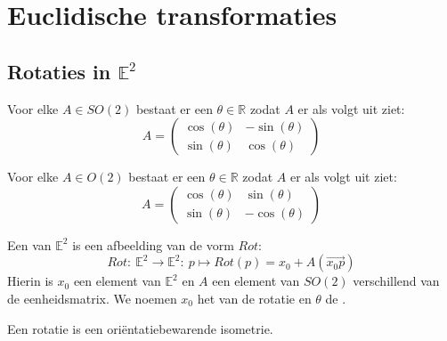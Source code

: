 \documentclass[main.tex]{subfiles}
\begin{document}
\chapter{Euclidische transformaties}
\label{cha:euclidische-transformaties}

\section{Rotaties in $\mathbb{E}^{2}$}
\label{sec:roties-in-e2}

\begin{lem}
  Voor elke $A\in SO(2)$ bestaat er een $\theta\in \mathbb{R}$ zodat $A$ er als volgt uit ziet:
  \[
  A =
  \begin{pmatrix}
    \cos(\theta) & -\sin(\theta)\\
    \sin(\theta) & \cos(\theta)
  \end{pmatrix}
  \]
\end{lem}

\begin{st}
  Voor elke $A\in O(2)$ bestaat er een $\theta\in \mathbb{R}$ zodat $A$ er als volgt uit ziet:
  \[
  A =
  \begin{pmatrix}
    \cos(\theta) & \sin(\theta)\\
    \sin(\theta) & -\cos(\theta)
  \end{pmatrix}
  \]
\end{st}

\begin{de}
  Een  van $\mathbb{E}^{2}$ is een afbeelding van de vorm $Rot$:
  \[ Rot:\ \mathbb{E}^{2} \rightarrow \mathbb{E}^{2}:\ p \mapsto Rot(p) = x_{0} + A(\overrightarrow{x_{0}p}) \]
  Hierin is $x_{0}$ een element van $\mathbb{E}^{2}$ en $A$ een element van $SO(2)$ verschillend van de eenheidsmatrix.
  We noemen $x_{0}$ het  van de rotatie en $\theta$ de .
\end{de}

\begin{ei}
  Een rotatie is een ori\"entatiebewarende isometrie.
\end{ei}

\end{document}
